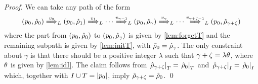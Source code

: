 \begin{proof}
We can take any path of the form
\[
	(p_0,\hat{\rho}_0) \overset{v_0}{\Longrightarrow}_{L} (p_0,\hat{\rho}_1) \overset{v_1}{\Longrightarrow}_{L} \cdots \overset{v_{\gamma-1}}{\Longrightarrow}_{L} (p_0,\hat{\rho}_\gamma) \overset{v_{\gamma}}{\Longrightarrow}_{L} \cdots \overset{v_{\gamma + \zeta - 1}}{\Longrightarrow}_{L} (p_0,\hat{\rho}_{\gamma + 
	 \zeta})
\]
where the part from $(p_0,\hat{\rho}_0)$ to $(p_0,\hat{\rho}_\gamma)$ is given by \cref{lem:forgetT} and the remaining subpath is given by \cref{lem:initT}, with $\tilde{\rho}_0 = \hat{\rho}_\gamma$. The only constraint about $\gamma$ is that there should be a positive integer $\lambda$ such that $\gamma + \zeta = \lambda \theta$, where $\theta$ is given by \cref{lem:idI}. The claim follows from $\left.\hat{\rho}_{\gamma + \zeta}\right|_{T} = \left.\hat{\rho}_0\right|_{T}$ and 
$\left.\hat{\rho}_{\gamma + \zeta}\right|_{I} = \left.\hat{\rho}_0\right|_{I}$ which, together with $I \cup T = |p_0|$, imply $\hat{\rho}_{\gamma + \zeta} = \hat{\rho}_0$.
\qed
\end{proof}
%


